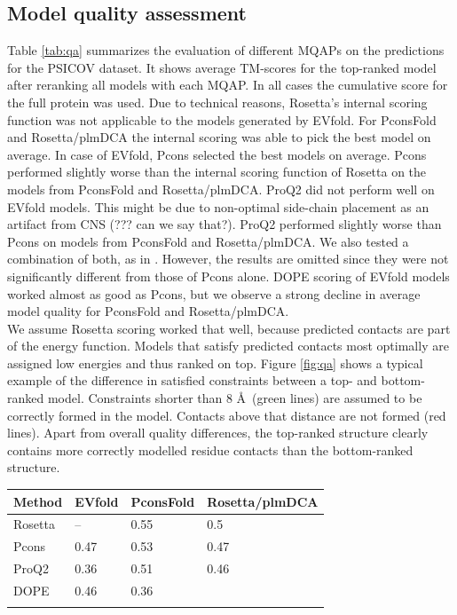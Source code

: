 \documentclass{bioinfo}
\begin{document}
\subsection{Model quality assessment}
Table \ref{tab:qa} summarizes the evaluation of different MQAPs on the predictions for the PSICOV dataset. It shows average TM-scores for the top-ranked model after reranking all models with each MQAP. In all cases the cumulative score for the full protein was used. Due to technical reasons, Rosetta's internal scoring function was not applicable to the models generated by EVfold. For PconsFold and Rosetta/plmDCA the internal scoring was able to pick the best model on average. In case of EVfold, Pcons selected the best models on average. Pcons performed slightly worse than the internal scoring function of Rosetta on the models from PconsFold and Rosetta/plmDCA. ProQ2 did not perform well on EVfold models. This might be due to non-optimal side-chain placement as an artifact from CNS (??? can we say that?). ProQ2 performed slightly worse than Pcons on models from PconsFold and Rosetta/plmDCA. We also tested a combination of both, as in \citeauthor{wallner_pcons.net:_2007} \citeyear{wallner_pcons.net:_2007}. However, the results are omitted since they were not significantly different from those of Pcons alone. DOPE scoring of EVfold models worked almost as good as Pcons, but we observe a strong decline in average model quality for PconsFold and Rosetta/plmDCA. \\\indent
We assume Rosetta scoring worked that well, because predicted contacts are part of the energy function. Models that satisfy predicted contacts most optimally are assigned low energies and thus ranked on top. Figure \ref{fig:qa} shows a typical example of the difference in satisfied constraints between a top- and bottom-ranked model. Constraints shorter than 8 \AA\ (green lines) are assumed to be correctly formed in the model. Contacts above that distance are not formed (red lines). Apart from overall quality differences, the top-ranked structure clearly contains more correctly modelled residue contacts than the bottom-ranked structure.\\\indent

\begin{table}[!t]
{\begin{tabular}{llll}\toprule
    Method  & EVfold & PconsFold & Rosetta/plmDCA \\ \midrule
    Rosetta & --     & 0.55     & 0.5          \\
    Pcons   & 0.47  & 0.53     & 0.47          \\
    ProQ2   & 0.36  & 0.51     & 0.46          \\
    DOPE    & 0.46  & 0.36     & ~              \\ \botrule
\end{tabular}}{}
\end{table}
\end{document}
